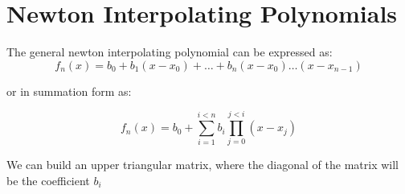 \section{Newton Interpolating Polynomials}

The general newton interpolating polynomial can be expressed as:
\begin{equation}
f_n(x) = b_0 + b_1(x-x_0) + \dots + b_n(x-x_0) \dots (x-x_{n-1})
\end{equation}

or in summation form as:

\begin{equation}
f_n(x) = b_0 + \sum_{i=1}^{i<n} b_i \prod_{j=0}^{j<i} (x-x_j)
\end{equation}

We can build an upper triangular matrix, where the diagonal of the matrix will be the coefficient $b_i$

